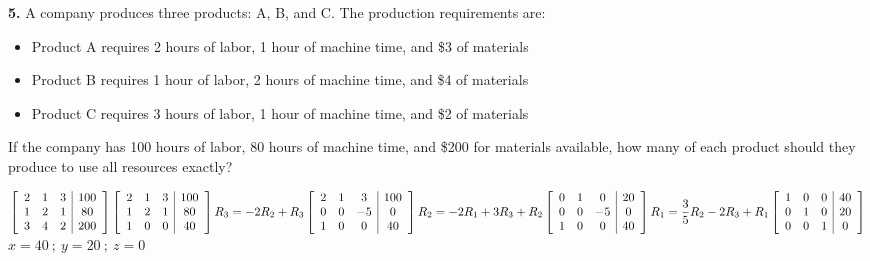 \documentclass[12pt]{article}
\begin{document}
\newpage

\textbf{5.} A company produces three products: A, B, and C. The production requirements are:
\begin{itemize}
\item Product A requires 2 hours of labor, 1 hour of machine time, and \$3 of materials
\item Product B requires 1 hour of labor, 2 hours of machine time, and \$4 of materials  
\item Product C requires 3 hours of labor, 1 hour of machine time, and \$2 of materials
\end{itemize}

If the company has 100 hours of labor, 80 hours of machine time, and \$200 for materials available, how many of each product should they produce to use all resources exactly?
\\[8pt]
\begin{minipage}[t][5cm][t]{\linewidth}
    $\displaystyle
    \left[\begin{array}{ccc|c}
    2 & 1 & 3 & 100 \\
    1 & 2 & 1 & 80 \\
    3 & 4 & 2 & 200
    \end{array}\right]
    \\[8pt] \left[\begin{array}{ccc|c}
    2 & 1 & 3 & 100 \\
    1 & 2 & 1 & 80 \\
    1 & 0 & 0 & 40
    \end{array}\right] R_3=-2R_2+R_3
    \\[8pt] \left[\begin{array}{ccc|c}
    2 & 1 & 3 & 100 \\
    0 & 0 & -5 & 0 \\
    1 & 0 & 0 & 40
    \end{array}\right] R_2=-2R_1+3R_3+R_2
    \\[8pt] \left[\begin{array}{ccc|c}
    0 & 1 & 0 & 20 \\
    0 & 0 & -5 & 0 \\
    1 & 0 & 0 & 40
    \end{array}\right] R_1=\frac{3}{5}R_2-2R_3+R_1
    \\[8pt] \left[\begin{array}{ccc|c}
    1 & 0 & 0 & 40 \\
    0 & 1 & 0 & 20 \\
    0 & 0 & 1 & 0
    \end{array}\right]$
    \\[8pt] $x=40 \ ; \ y=20 \ ; \ z=0$
\end{minipage}
\end{document}
